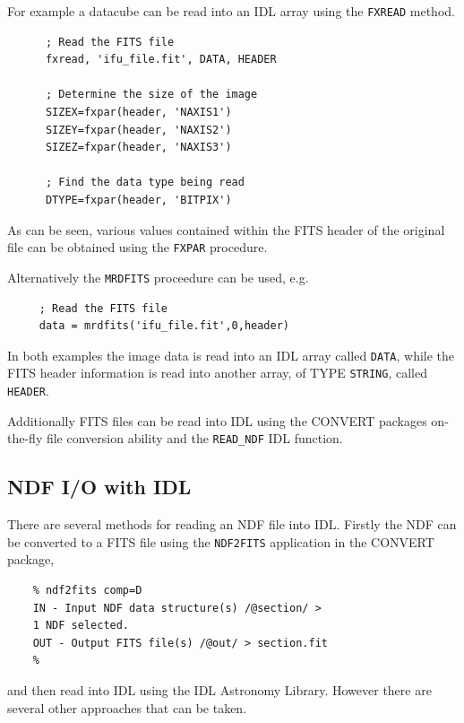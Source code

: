 \documentclass[twoside,11pt]{article}
\newcommand{\htmladdnormallink}[2]{#1}
\newcommand{\xref}[3]{#1}
\newcommand{\xlabel}[1]{}
\begin{document}
For example a datacube can be read into an IDL array using the {\tt FXREAD} method.

\small\begin{verbatim}
      ; Read the FITS file 
      fxread, 'ifu_file.fit', DATA, HEADER
       
      ; Determine the size of the image
      SIZEX=fxpar(header, 'NAXIS1')
      SIZEY=fxpar(header, 'NAXIS2')
      SIZEZ=fxpar(header, 'NAXIS3')
       
      ; Find the data type being read
      DTYPE=fxpar(header, 'BITPIX')
\end{verbatim}\normalsize

As can be seen, various values contained within the FITS header of the original file can be obtained using the {\tt FXPAR} procedure. 

Alternatively the {\tt MRDFITS} proceedure can be used, e.g.

\small\begin{verbatim}
     ; Read the FITS file
     data = mrdfits('ifu_file.fit',0,header)
\end{verbatim}\normalsize

In both examples the image data is read into an IDL array called {\tt DATA}, while the FITS header information is read into another array, of TYPE {\tt STRING}, called {\tt HEADER}. 

Additionally FITS files can be read into IDL using the \xref{CONVERT}{sun55}{} packages \xref{on-the-fly file conversion}{sun55}{sect_auto} ability and the \xref{{\tt READ\_NDF}}{sun55}{READ_NDF} IDL function.
 
\subsection{\xlabel{sc16_ndfidl}NDF I/O with IDL\label{sc16_ndfidl}}

There are several methods for reading an NDF file into IDL. Firstly the NDF can be converted to a FITS file using the \xref{{\tt NDF2FITS}}{sun55}{NDF2FITS} application in the \xref{CONVERT}{sun55}{} package,

\small\begin{verbatim}
    % ndf2fits comp=D
    IN - Input NDF data structure(s) /@section/ > 
    1 NDF selected.
    OUT - Output FITS file(s) /@out/ > section.fit
    %
\end{verbatim}\normalsize

and then read into IDL using the \htmladdnormallink{IDL Astronomy Library}{http://idlastro.gsfc.nasa.gov/homepage.html}. However there are several other approaches that can be taken.
\end{document}
